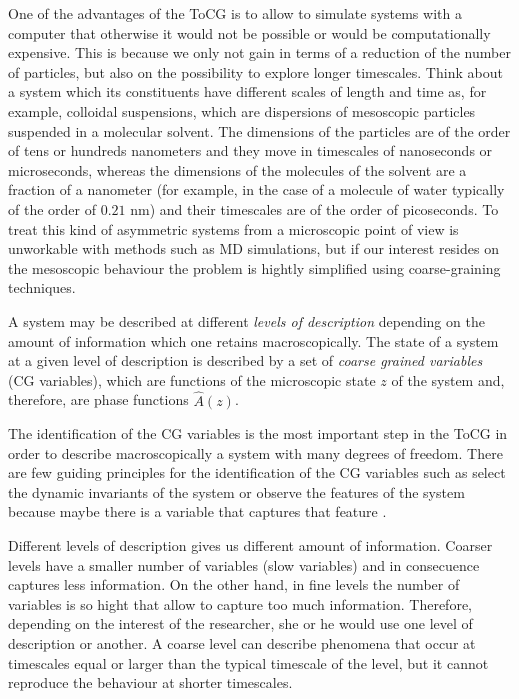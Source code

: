 \documentclass[b5paper,openright,10pt]{book}
\begin{document}
One of the advantages of the ToCG is to allow to simulate systems with a computer that otherwise it would not be possible or would be computationally expensive. 
This is because we only not gain in terms of a reduction of the number of particles, but also on the possibility to explore longer timescales. 
Think about a system which its constituents have different scales of length and time as, 
for example, colloidal suspensions, which are dispersions of mesoscopic particles suspended in a molecular solvent.
The dimensions of the particles are of the order of tens or hundreds nanometers and they move in timescales of nanoseconds or microseconds, whereas the dimensions of the molecules of the solvent are a fraction of a nanometer (for example, in the case of a molecule of water typically of the order of $0.21$ nm) and their timescales are of the order of picoseconds. To treat this kind of asymmetric systems from a microscopic point of view is unworkable with methods such as MD simulations, but if our interest resides on the mesoscopic behaviour the problem is hightly simplified using coarse-graining techniques.    

A system may be described at different {\it levels of description} depending on the amount of information which one retains macroscopically. The state of a system at a given level of description is described by a set of {\it coarse grained variables} (CG variables), which are functions of the microscopic state $z$ of the system and, therefore, are phase functions $\hat{A}(z)$. 

The identification of the CG variables is the most important step in the ToCG in order to describe macroscopically a system with many degrees of freedom. There are few guiding principles for the identification of the CG variables such as select the dynamic invariants of the system or observe the features of the system because maybe there is a variable that captures that feature \cite{Karttunen2004}.

Different levels of description gives us different amount of information. Coarser levels have a smaller number of variables (slow variables) and in consecuence captures less information. On the other hand, in fine levels the number of variables is so hight that allow to capture too much information. 
Therefore, depending on the interest of the researcher, she or he would use one level of description or another. A coarse level can describe phenomena that occur at timescales equal or larger than the typical timescale of the level, but it cannot reproduce the behaviour at shorter timescales.
\end{document}

